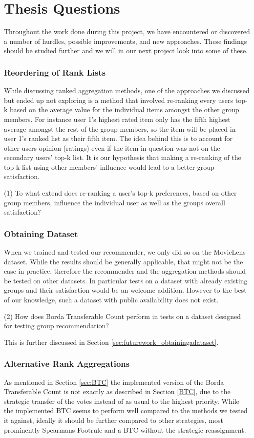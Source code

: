 \section{Thesis Questions}
Throughout the work done during this project, we have encountered or discovered a number of hurdles, possible improvements, and new approaches. These findings should be studied further and we will in our next project look into some of these.
\subsubsection{Reordering of Rank Lists}
While discussing ranked aggregation methods, one of the approaches we discussed but ended up not exploring is a method that involved re-ranking every users top-k based on the average value for the individual items amongst the other group members. For instance user 1's highest rated item only has the fifth highest average amongst the rest of the group members, so the item will be placed in user 1's ranked list as their fifth item. The idea behind this is to account for other users opinion (ratings) even if the item in question was not on the secondary users' top-k list. It is our hypothesis that making a re-ranking of the top-k list using other members' influence would lead to a better group satisfaction.

(1) To what extend does re-ranking a user's top-k preferences, based on other group members, influence the individual user as well as the groups overall satisfaction?

\subsubsection{Obtaining Dataset}
When we trained and tested our recommender, we only did so on the MovieLens dataset. While the results should be generally applicable, that might not be the case in practice, therefore the recommender and the aggregation methods should be tested on other datasets. In particular tests on a dataset with already existing groups and their satisfaction would be an welcome addition. However to the best of our knowledge, such a dataset with public availability does not exist. 

(2) How does Borda Transferable Count perform in tests on a dataset designed for testing group recommendation?

This is further discussed in Section \ref{sec:futurework_obtainingadataset}.

\subsubsection{Alternative Rank Aggregations}
As mentioned in Section \ref{sec:BTC} the implemented version of the Borda Transferable Count is not exactly as described in Section \ref{BTC}, due to the strategic transfer of the votes instead of as usual to the highest priority. While the implemented BTC seems to perform well compared to the methods we tested it against, ideally it should be further compared to other strategies, most prominently Spearmans Footrule and a BTC without the strategic reassignment.

